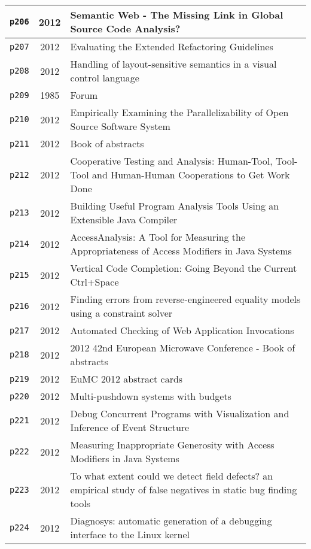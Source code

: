 \begin{longtable}{| c | c | p{16cm} |}
  \hline
  \texttt{p206} & 2012 & Semantic Web - The Missing Link in Global Source Code Analysis? \\
  \hline
  \texttt{p207} & 2012 & Evaluating the Extended Refactoring Guidelines \\
  \hline
  \texttt{p208} & 2012 & Handling of layout-sensitive semantics in a visual control language \\
  \hline
  \texttt{p209} & 1985 & Forum \\
  \hline
  \texttt{p210} & 2012 & Empirically Examining the Parallelizability of Open Source Software System \\
  \hline
  \texttt{p211} & 2012 & Book of abstracts \\
  \hline
  \texttt{p212} & 2012 & Cooperative Testing and Analysis: Human-Tool, Tool-Tool and Human-Human Cooperations to Get Work Done \\
  \hline
  \texttt{p213} & 2012 & Building Useful Program Analysis Tools Using an Extensible Java Compiler \\
  \hline
  \texttt{p214} & 2012 & AccessAnalysis: A Tool for Measuring the Appropriateness of Access Modifiers in Java Systems \\
  \hline
  \texttt{p215} & 2012 & Vertical Code Completion: Going Beyond the Current Ctrl+Space \\
  \hline
  \texttt{p216} & 2012 & Finding errors from reverse-engineered equality models using a constraint solver \\
  \hline
  \texttt{p217} & 2012 & Automated Checking of Web Application Invocations \\
  \hline
  \texttt{p218} & 2012 & 2012 42nd European Microwave Conference - Book of abstracts \\
  \hline
  \texttt{p219} & 2012 & EuMC 2012 abstract cards \\
  \hline
  \texttt{p220} & 2012 & Multi-pushdown systems with budgets \\
  \hline
  \texttt{p221} & 2012 & Debug Concurrent Programs with Visualization and Inference of Event Structure \\
  \hline
  \texttt{p222} & 2012 & Measuring Inappropriate Generosity with Access Modifiers in Java Systems \\
  \hline
  \texttt{p223} & 2012 & To what extent could we detect field defects? an empirical study of false negatives in static bug finding tools \\
  \hline
  \texttt{p224} & 2012 & Diagnosys: automatic generation of a debugging interface to the Linux kernel \\

\end{longtable}
